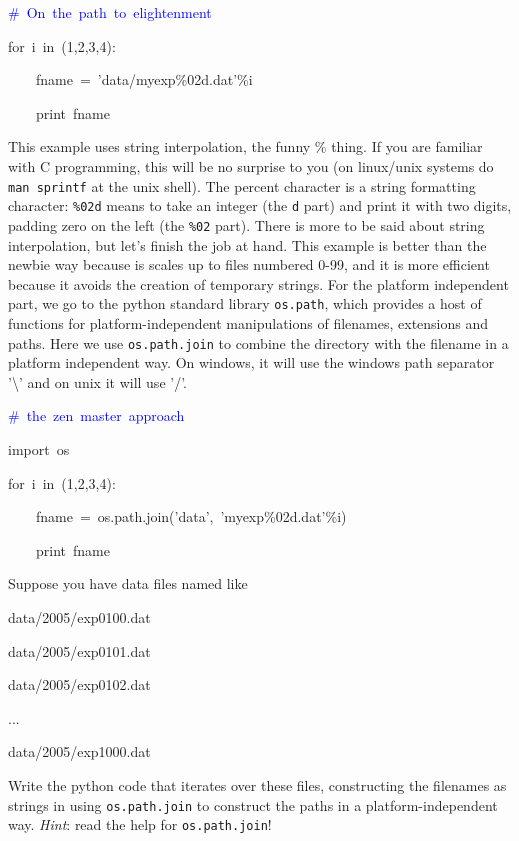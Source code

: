 \begin{lyxcode}
\textcolor{blue}{\#~On~the~path~to~elightenment}

for~i~in~(1,2,3,4):

~~~~fname~=~'data/myexp\%02d.dat'\%i

~~~~print~fname
\end{lyxcode}
This example uses string interpolation, the funny \% thing. If you
are familiar with C programming, this will be no surprise to you (on
linux/unix systems do \texttt{man sprintf} at the unix shell). The
percent character is a string formatting character: \texttt{\%02d}
means to take an integer (the \texttt{d} part) and print it with two
digits, padding zero on the left (the \texttt{\%02} part). There is
more to be said about string interpolation, but let's finish the job
at hand. This example is better than the newbie way because is scales
up to files numbered 0-99, and it is more efficient because it avoids
the creation of temporary strings. For the platform independent part,
we go to the python standard library \texttt{os.path}, which provides
a host of functions for platform-independent manipulations of filenames,
extensions and paths. Here we use \texttt{os.path.join} to combine
the directory with the filename in a platform independent way. On
windows, it will use the windows path separator '\textbackslash{}'
and on unix it will use '/'.

\begin{lyxcode}
\textcolor{blue}{\#~the~zen~master~approach}

import~os

for~i~in~(1,2,3,4):

~~~~fname~=~os.path.join('data',~'myexp\%02d.dat'\%i)

~~~~print~fname
\end{lyxcode}
\begin{xca}
Suppose you have data files named like
\end{xca}
\begin{lyxcode}
data/2005/exp0100.dat

data/2005/exp0101.dat

data/2005/exp0102.dat

...

data/2005/exp1000.dat
\end{lyxcode}
Write the python code that iterates over these files, constructing
the filenames as strings in using \texttt{os.path.join} to construct
the paths in a platform-independent way. \textit{Hint}: read the help
for \texttt{os.path.join}!

